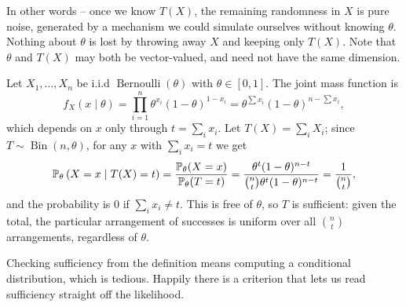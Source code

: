 \documentclass[a4paper]{scrartcl}
\newcommand{\Bin}{\operatorname{Bin}}
\newcommand{\Bern}{\operatorname{Bernoulli}}
\begin{document}
In other words -- once we know $T(X)$, the remaining randomness in $X$ is pure noise, generated by a mechanism we could simulate ourselves without knowing $\theta$. Nothing about $\theta$ is lost by throwing away $X$ and keeping only $T(X)$. Note that $\theta$ and $T(X)$ may both be vector-valued, and need not have the same dimension.

\begin{example}
  Let $X_1, \dots, X_n$ be i.i.d $\Bern(\theta)$ with $\theta \in [0,1]$. The joint mass function is
  $$
  f_X(x \mid \theta) = \prod_{i = 1}^{n} \theta^{x_i}(1-\theta)^{1 - x_i} = \theta^{\sum x_i}(1-\theta)^{n - \sum x_i},
  $$
  which depends on $x$ only through $t = \sum_i x_i$. Let $T(X) = \sum_i X_i$; since $T \sim \Bin(n, \theta)$, for any $x$ with $\sum_i x_i = t$ we get
  $$
  \mathbb{P}_\theta\left(X = x \mid T(X) = t\right) = \frac{\mathbb{P}_\theta(X = x)}{\mathbb{P}_\theta(T = t)} = \frac{\theta^{t}(1-\theta)^{n - t}}{\binom{n}{t}\theta^t(1-\theta)^{n-t}} = \frac{1}{\binom{n}{t}},
  $$
  and the probability is $0$ if $\sum_i x_i \neq t$. This is free of $\theta$, so $T$ is sufficient: given the total, the particular arrangement of successes is uniform over all $\binom{n}{t}$ arrangements, regardless of $\theta$.
\end{example}

Checking sufficiency from the definition means computing a conditional distribution, which is tedious. Happily there is a criterion that lets us read sufficiency straight off the likelihood.
\end{document}
